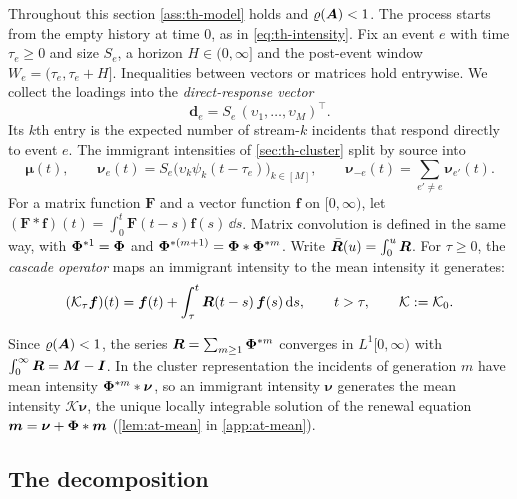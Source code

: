 Throughout this section \cref{ass:th-model} holds and $\varrho(\bm{A})<1$. The process
starts from the empty history at time $0$, as in \eqref{eq:th-intensity}. Fix an
event $e$ with time $\tau_e\ge0$ and size $S_e$, a horizon $H\in(0,\infty]$ and the
post-event window $W_e=(\tau_e,\tau_e+H]$. Inequalities between vectors or matrices
hold entrywise. We collect the loadings into the \emph{direct-response vector}
\[
\bm d_e=S_e\,(\upsilon_1,\dots,\upsilon_M)^{\top}.
\]
Its $k$th entry is the expected number of stream-$k$ incidents that respond directly to
event $e$. The immigrant intensities of \cref{sec:th-cluster} split by source into
\[
\bm\mu(t),\qquad
\bm\nu_e(t)=S_e\bigl(\upsilon_k\psi_k(t-\tau_e)\bigr)_{k\in[M]},\qquad
\bm\nu_{-e}(t)=\sum_{e'\neq e}\bm\nu_{e'}(t).
\]
For a matrix function $\bm F$ and a vector function $\bm f$ on $[0,\infty)$, let
$(\bm F*\bm f)(t)=\int_0^t\bm F(t-s)\bm f(s)\,\dd s$. Matrix convolution is defined in
the same way, with $\bm{\Phi}^{*1}=\bm{\Phi}$ and $\bm{\Phi}^{*(m+1)}=\bm{\Phi}*\bm{\Phi}^{*m}$. Write
$\bar{\bm{R}}(u)=\int_0^u\bm{R}$. For $\tau\ge0$, the \emph{cascade operator} maps an
immigrant intensity to the mean intensity it generates:
\begin{equation}\label{eq:at-cascade}
  (\mathcal K_\tau\bm f)(t)=\bm f(t)+\int_\tau^t\bm{R}(t-s)\,\bm f(s)\,\mathrm{d} s,
  \qquad t>\tau,\qquad \mathcal K:=\mathcal K_0 .
\end{equation}

Since $\varrho(\bm{A})<1$, the series $\bm{R}=\sum_{m\ge1}\bm{\Phi}^{*m}$ converges in
$L^1[0,\infty)$ with $\int_0^\infty\bm{R}=\bm{M}-\bm{I}$. In the cluster representation the
incidents of generation $m$ have mean intensity $\bm{\Phi}^{*m}*\bm\nu$, so an immigrant
intensity $\bm\nu$ generates the mean intensity $\mathcal K\bm\nu$, the unique locally
integrable solution of the renewal equation $\bm m=\bm\nu+\bm{\Phi}*\bm m$
(\cref{lem:at-mean} in \cref{app:at-mean}).

\subsection{The decomposition}\label{sec:at-decomp}

